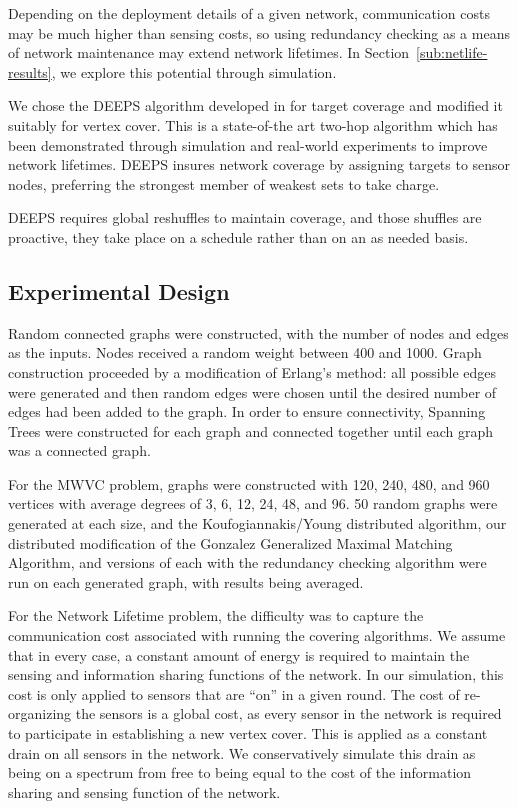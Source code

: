 Depending on the deployment details of a given network, communication costs may be much higher than sensing costs, so using redundancy checking as a means of network maintenance may extend network lifetimes. In Section~\ref{sub:netlife-results}, we explore this potential through simulation.

We chose the DEEPS algorithm developed in \cite{1640702}for target coverage and modified it suitably for vertex cover. This is a state-of-the art two-hop algorithm which has been demonstrated through simulation and real-world experiments to improve network lifetimes. DEEPS insures network coverage by assigning targets to sensor nodes, preferring the strongest member of weakest sets to take charge. 

DEEPS requires global reshuffles to maintain coverage, and those shuffles are proactive, they take place on a schedule rather than on an as needed basis.

\subsection{Experimental Design}
\label{sub:exp-design}
Random connected graphs were constructed, with the number of nodes and edges as the inputs. Nodes received a random weight between 400 and 1000. Graph construction proceeded by a modification of Erlang's method: all possible edges were generated and then random edges were chosen until the desired number of edges had been added to the graph. In order to ensure connectivity, Spanning Trees were constructed for each graph and connected together until each graph was a connected graph. 

For the MWVC problem, graphs were constructed with 120, 240, 480, and 960 vertices with average degrees of 3, 6, 12, 24, 48, and 96. 50 random graphs were generated at each size, and the Koufogiannakis/Young distributed algorithm\cite{1582746}, our distributed modification of the Gonzalez Generalized Maximal Matching Algorithm\cite{Gonzalez1995129}, and versions of each with the redundancy checking algorithm were run on each generated graph, with results being averaged.

For the Network Lifetime problem, the difficulty was to capture the communication cost associated with running the covering algorithms. We assume that in every case, a constant amount of energy is required to maintain the sensing and information sharing functions of the network. In our simulation, this cost is only applied to sensors that are ``on'' in a given round. The cost of re-organizing the sensors is a global cost, as every sensor in the network is required to participate in establishing a new vertex cover. This is applied as a constant drain on all sensors in the network. We conservatively simulate this drain as being on a spectrum from free to being equal to the cost of the information sharing and sensing function of the network. 


